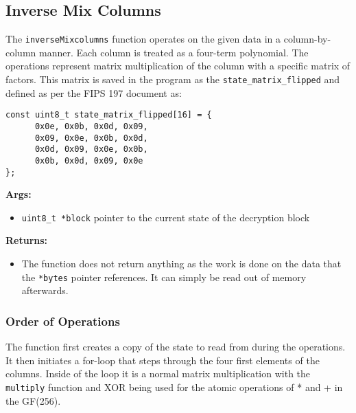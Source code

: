 \subsection{Inverse Mix Columns}
\label{ch:dec_inversemixcolumns}
The \lstinline{inverseMixcolumns} function operates on the given data in a column-by-column manner. Each column is treated as a four-term polynomial. The operations represent matrix multiplication of the column with a specific matrix of factors. This matrix is saved in the program as the \lstinline{state_matrix_flipped} and defined as per the FIPS 197 document as:
\begin{lstlisting}
const uint8_t state_matrix_flipped[16] = {
      0x0e, 0x0b, 0x0d, 0x09,
      0x09, 0x0e, 0x0b, 0x0d,
      0x0d, 0x09, 0x0e, 0x0b,
      0x0b, 0x0d, 0x09, 0x0e
};
\end{lstlisting}

\textbf{Args:}
\begin{itemize}
  \item \lstinline{uint8_t *block} pointer to the current state of the decryption block
\end{itemize}

\textbf{Returns:}
\begin{itemize}
  \item The function does not return anything as the work is done on the data that the \lstinline{*bytes} pointer references. It can simply be read out of memory afterwards.
\end{itemize}

\subsubsection{Order of Operations}
The function first creates a copy of the state to read from during the operations. It then initiates a for-loop that steps through the four first elements of the columns. Inside of the loop it is a normal matrix multiplication with the \lstinline{multiply} function and XOR being used for the atomic operations of * and + in the GF(256).
